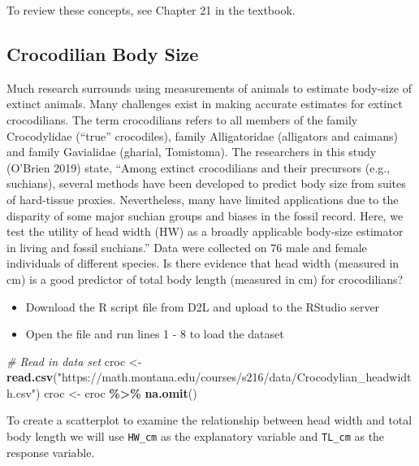 \documentclass[
]{report}
\newenvironment{Shaded}{\begin{snugshade}}{\end{snugshade}}
\newcommand{\CommentTok}[1]{\textcolor[rgb]{0.56,0.35,0.01}{\textit{#1}}}
\newcommand{\FunctionTok}[1]{\textcolor[rgb]{0.13,0.29,0.53}{\textbf{#1}}}
\newcommand{\NormalTok}[1]{#1}
\newcommand{\OtherTok}[1]{\textcolor[rgb]{0.56,0.35,0.01}{#1}}
\newcommand{\SpecialCharTok}[1]{\textcolor[rgb]{0.81,0.36,0.00}{\textbf{#1}}}
\newcommand{\StringTok}[1]{\textcolor[rgb]{0.31,0.60,0.02}{#1}}
\begin{document}
To review these concepts, see Chapter 21 in the textbook.

\subsection{Crocodilian Body Size}\label{crocodilian-body-size}

Much research surrounds using measurements of animals to estimate body-size of extinct animals. Many challenges exist in making accurate estimates for extinct crocodilians. The term crocodilians refers to all members of the family Crocodylidae (``true'' crocodiles), family Alligatoridae (alligators and caimans) and family Gavialidae (gharial, Tomistoma). The researchers in this study (O'Brien 2019) state, ``Among extinct crocodilians and their precursors (e.g., suchians), several methods have been developed to predict body size from suites of hard-tissue proxies. Nevertheless, many have limited applications due to the disparity of some major suchian groups and biases in the fossil record. Here, we test the utility of head width (HW) as a broadly applicable body-size estimator in living and fossil suchians.'' Data were collected on 76 male and female individuals of different species. Is there evidence that head width (measured in cm) is a good predictor of total body length (measured in cm) for crocodilians?

\begin{itemize}
\item
  Download the R script file from D2L and upload to the RStudio server
\item
  Open the file and run lines 1 - 8 to load the dataset
\end{itemize}

\begin{Shaded}
\begin{Highlighting}[]
\CommentTok{\# Read in data set}
\NormalTok{croc }\OtherTok{\textless{}{-}} \FunctionTok{read.csv}\NormalTok{(}\StringTok{"https://math.montana.edu/courses/s216/data/Crocodylian\_headwidth.csv"}\NormalTok{)}
\NormalTok{croc }\OtherTok{\textless{}{-}}\NormalTok{ croc }\SpecialCharTok{\%\textgreater{}\%}
    \FunctionTok{na.omit}\NormalTok{()}
\end{Highlighting}
\end{Shaded}

To create a scatterplot to examine the relationship between head width and total body length we will use \texttt{HW\_cm} as the explanatory variable and \texttt{TL\_cm} as the response variable.
\end{document}
